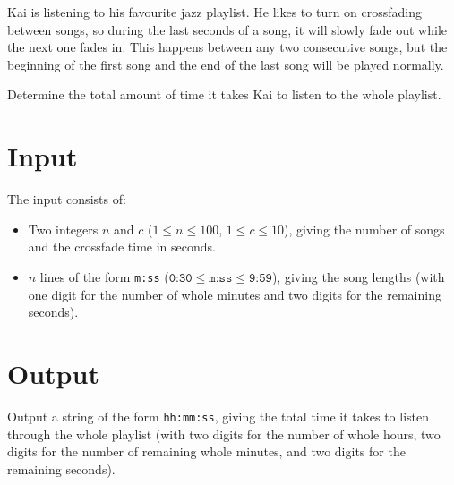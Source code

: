 
%
Kai is listening to his favourite jazz playlist.
He likes to turn on crossfading between songs, so during the last seconds of a song, it will slowly fade out while the next one fades in.
This happens between any two consecutive songs, but the beginning of the first song and the end of the last song will be played normally.

Determine the total amount of time it takes Kai to listen to the whole playlist.

\section*{Input}
The input consists of:
\begin{itemize}
	\item Two integers $n$ and $c$ ($1 \le n \le 100$, $1 \le c \le 10$), giving the number of songs and the crossfade time in seconds.
	\item $n$ lines of the form \texttt{m:ss} ($\texttt{0:30} \le \texttt{m:ss} \le \texttt{9:59}$), giving the song lengths (with one digit for the number of whole minutes and two digits for the remaining seconds).
\end{itemize}

\section*{Output}
Output a string of the form \texttt{hh:mm:ss}, giving the total time it takes to listen through the whole playlist (with two digits for the number of whole hours, two digits for the number of remaining whole minutes, and two digits for the remaining seconds).
